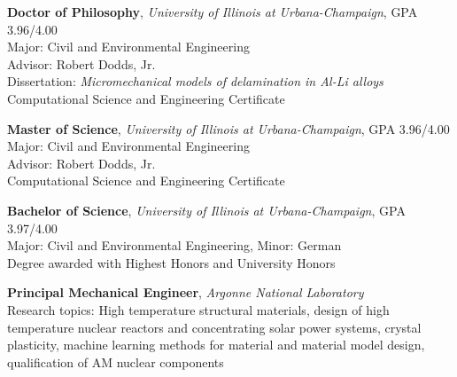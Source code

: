 
\usepackage[sorting=ydnt,style=numeric,defernumbers]{biblatex}










\makecvtitle


\textbf{Doctor of Philosophy}, \emph{University of Illinois at Urbana-Champaign},
GPA 3.96/4.00\\
Major: Civil and Environmental Engineering\\
Advisor: Robert Dodds, Jr. \\
Dissertation: \textit{Micromechanical models of delamination in Al-Li
alloys}\\
Computational Science and Engineering Certificate

\textbf{Master of Science}, \emph{University of Illinois at Urbana-Champaign},
GPA 3.96/4.00 \\
Major: Civil and Environmental Engineering\\
Advisor: Robert Dodds, Jr. \\
Computational Science and Engineering Certificate

\textbf{Bachelor of Science}, \emph{University of Illinois at Urbana-Champaign},
GPA 3.97/4.00 \\
Major: Civil and Environmental Engineering, Minor: German\\
Degree awarded with Highest Honors and University Honors 


\textbf{Principal Mechanical Engineer}, \emph{Argonne National Laboratory}
\\
Research topics: High temperature structural materials, design
of high temperature nuclear reactors and concentrating solar power systems,
crystal plasticity, machine learning
methods for material and material model design,
qualification of AM nuclear components

